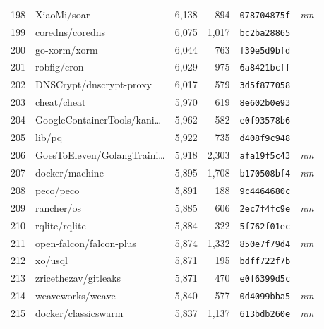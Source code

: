 {\begin{supertabular}{llrrll}
        198 &                        XiaoMi/soar &  6,138 &    894 &  \texttt{078704875f} &  \textit{nm} \\
        199 &                    coredns/coredns &  6,075 &  1,017 &  \texttt{bc2ba28865} &              \\
        200 &                       go-xorm/xorm &  6,044 &    763 &  \texttt{f39e5d9bfd} &              \\
        201 &                        robfig/cron &  6,029 &    975 &  \texttt{6a8421bcff} &              \\
        202 &            DNSCrypt/dnscrypt-proxy &  6,017 &    579 &  \texttt{3d5f877058} &              \\
        203 &                        cheat/cheat &  5,970 &    619 &  \texttt{8e602b0e93} &              \\
        204 &    GoogleContainerTools/kani\ldots &  5,962 &    582 &  \texttt{e0f93578b6} &              \\
        205 &                             lib/pq &  5,922 &    735 &  \texttt{d408f9c948} &              \\
        206 &    GoesToEleven/GolangTraini\ldots &  5,918 &  2,303 &  \texttt{afa19f5c43} &  \textit{nm} \\
        207 &                     docker/machine &  5,895 &  1,708 &  \texttt{b170508bf4} &  \textit{nm} \\
        208 &                          peco/peco &  5,891 &    188 &  \texttt{9c4464680c} &              \\
        209 &                         rancher/os &  5,885 &    606 &  \texttt{2ec7f4fc9e} &  \textit{nm} \\
        210 &                      rqlite/rqlite &  5,884 &    322 &  \texttt{5f762f01ec} &              \\
        211 &            open-falcon/falcon-plus &  5,874 &  1,332 &  \texttt{850e7f79d4} &  \textit{nm} \\
        212 &                            xo/usql &  5,871 &    195 &  \texttt{bdff722f7b} &              \\
        213 &               zricethezav/gitleaks &  5,871 &    470 &  \texttt{e0f6399d5c} &              \\
        214 &                   weaveworks/weave &  5,840 &    577 &  \texttt{0d4099bba5} &  \textit{nm} \\
        215 &                docker/classicswarm &  5,837 &  1,137 &  \texttt{613bdb260e} &  \textit{nm} \\

\end{supertabular}}
